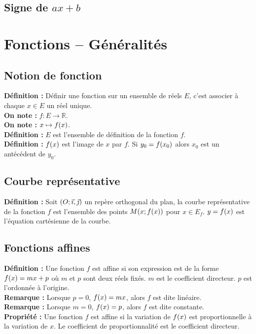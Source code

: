 \documentclass[a4paper,titlepage]{article}
\makeatletter
\let\oldsection\section
\renewcommand\section{\clearpage\oldsection}
\let\oldleft\left
\renewcommand{\left}{\mathopen{}\mathclose\bgroup\oldleft}
\let\oldright\right
\renewcommand{\right}{\aftergroup\egroup\oldright}
\def\tikzscale{1}\begin{lrbox}{\measure@tikzpicture}
\edef\tikzscale{\pgfmathresult}
\makeatother
\begin{document}
    \subsection[Signe de $ax+b$]{\boldmath Signe de $ax+b$}
        \begin{scaletikzpicturetowidth}{\textwidth}
        \end{scaletikzpicturetowidth}
\section{Fonctions – Généralités}
    \subsection{Notion de fonction}
        \textbf{Définition :} Définir une fonction sur un ensemble de réels $E$, c’est associer à chaque $x\in E$ un réel unique.
        \\
        \textbf{On note :} $f:E\rightarrow\mathbb{R}$.
        \\
        \textbf{On note :} $x\mapsto f\left(x\right)$.
        \\
        \textbf{Définition :} $E$ est l’ensemble de définition de la fonction $f$.
        \\
        \textbf{Définition :} $f\left(x\right)$ est l’image de $x$ par $f$. Si $y_{0}=f\left(x_{0}\right)$ alors $x_{0}$ est un antécédent de $y_{0}$.
    \subsection{Courbe représentative}
        \textbf{Définition :} Soit $\left(O;\vec{\imath},\vec{\jmath}\right)$ un repère orthogonal du plan, la courbe re\-pré\-sen\-ta\-tive de la fonction $f$ est l’ensemble des points $M\left(x;f\left(x\right)\right)$ pour $x\in E_{f}$. $y=f\left(x\right)$ est l’équation cartésienne de la courbe.
    \subsection{Fonctions affines}
        \textbf{Définition :} Une fonction $f$ est affine si son expression est de la forme $f\left(x\right)=mx+p$ où $m$ et $p$ sont deux réels fixés. $m$ est le coefficient directeur. $p$ est l’ordonnée à l’origine.
        \\
        \textbf{Remarque :} Lorsque $p=0$, $f\left(x\right)=mx$, alors $f$ est dite linéaire.
        \\
        \textbf{Remarque :} Lorsque $m=0$, $f\left(x\right)=p$, alors $f$ est dite constante.
        \\
        \textbf{Propriété :} Une fonction $f$ est affine si la variation de $f\left(x\right)$ est proportionnelle à la variation de $x$. Le coefficient de proportionnalité est le coefficient directeur.
\end{document}

